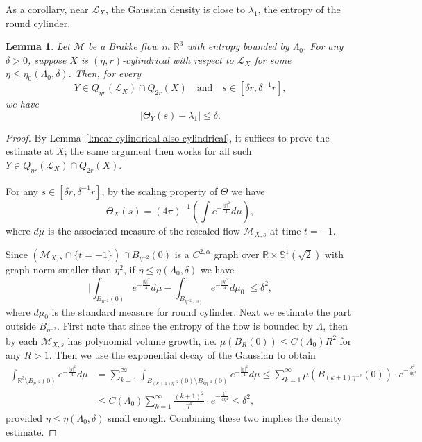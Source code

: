 \documentclass[11pt,reqno]{amsart}
\numberwithin{equation}{section}
\newcommand{\RR}{\mathds{R}}
\newcommand{\cL}{\mathcal{L}}
\newcommand{\cM}{\mathcal{M}}
\newtheorem{lemma}[equation]{Lemma}
\theoremstyle{definition}
\theoremstyle{remark}
\theoremstyle{remark}
\theoremstyle{remark}
\theoremstyle{remark}\newtheorem{conjecture}[equation]{Conjecture}
\theoremstyle{remark}\newtheorem{question}[equation]{Question}
\begin{document}
As a corollary, near $\cL_X$, the Gaussian density is close to $\lambda_1$, the entropy of the round cylinder.


\begin{lemma}\label{l:almost cylindrical implies almost pinched}
Let $\cM$ be a Brakke flow in $\RR^3$ with entropy bounded by $\Lambda_0$. For any $\delta>0$, suppose $X$ is $(\eta,r)$-cylindrical with respect to $\cL_X$ for some $\eta\le \eta_0(\Lambda_0,\delta)$. Then, for every 
\[
Y\in Q_{\eta r}(\cL_X)\cap Q_{2r}(X)\quad\text{and}\quad s\in[\delta r,\delta^{-1}r],
\]
we have
\[
\big|\Theta_Y(s)-\lambda_1\big|\le \delta .
\]
\end{lemma}

\begin{proof}
By Lemma~\ref{l:near cylindrical also cylindrical}, it suffices to prove the estimate at $X$; the same argument then works for all such $Y \in Q_{\eta r}(\cL_X) \cap Q_{2r}(X)$.

For any $s\in [\delta r, \delta^{-1}r]$, by the scaling property of $\Theta$ we have
    \begin{equation*}
        \Theta_X(s) = (4\pi)^{-1} (\int e^{-\frac{|y|^2}{4}} d\mu),
    \end{equation*}
    where $d\mu$ is the associated measure of the rescaled flow $\cM_{X,s}$ at time $t=-1$. 

    Since $ (\cM_{X,s}\cap \{t=-1\}) \cap B_{\eta^{-2}}(0)$ is a $C^{2,\alpha}$ graph over $\RR \times \mathds{S}^1(\sqrt{2})$ with graph norm smaller than $\eta^2$, if $\eta\le \eta(\Lambda_0,\delta)$ we have
    \begin{equation*}
       \Big|\int_{B_{\eta^{-2}}(0)} e^{-\frac{|y|^2}{4}} d\mu- \int_{B_{\eta^{-2}(0)}} e^{-\frac{|y|^2}{4}}d\mu_0 \Big|\le  \delta^2,
    \end{equation*}
where $d\mu_0$ is the standard measure for round cylinder. Next we estimate the part outside $B_{\eta^{-2}}$. First note that since the entropy of the flow is bounded by $\Lambda$, then by \cite{CM12} each $\cM_{X,s}$ has polynomial volume growth, i.e. $\mu(B_R(0)) \le C(\Lambda_0)R^2$ for any $R>1$. Then we use the exponential decay of the Gaussian to obtain
\begin{equation*}
\begin{split}
    \int_{\RR^3 \setminus B_{\eta^{-2}}(0)} e^{-\frac{|y|^2}{4}} d\mu &= \sum_{k=1}^{\infty} \int_{B_{(k+1)\eta^{-2}}(0) \setminus B_{k\eta^{-2}}(0)} e^{-\frac{|y|^2}{4}} d\mu \le \sum_{k=1}^{\infty} \mu( B_{(k+1)\eta^{-2}}(0) ) \cdot e^{-\frac{k^2}{4\eta^4}}  \\
    & \le C(\Lambda_0) \sum_{k=1}^{\infty} \frac{(k+1)^2}{\eta^4} \cdot e^{-\frac{k^2}{4\eta^4}} \le \delta^2,
\end{split}
\end{equation*}
provided $\eta \le \eta(\Lambda_0,\delta)$ small enough. Combining these two implies the density estimate.  
\end{proof}
\end{document}
